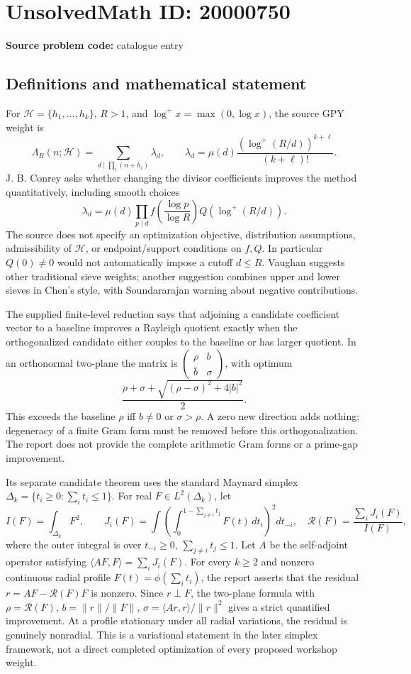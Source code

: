 \documentclass[11pt]{article}
\begin{document}
\section*{UnsolvedMath ID: 20000750}
\textbf{Source problem code:} catalogue entry
\subsection{Definitions and mathematical statement}
For \(\mathcal H=\{h_1,\ldots,h_k\}\), \(R>1\), and \(\log^+x=\max(0,\log x)\), the source GPY weight is
\[
 \Lambda_R(n;\mathcal H)=\sum_{d\mid\prod_i(n+h_i)}\lambda_d,
 \qquad\lambda_d=\mu(d)\frac{(\log^+(R/d))^{k+\ell}}{(k+\ell)!}.
\]
J. B. Conrey asks whether changing the divisor coefficients improves the method quantitatively, including smooth choices
\[
 \lambda_d=\mu(d)\prod_{p\mid d}f\left(\frac{\log p}{\log R}\right)
 Q(\log^+(R/d)).
\]
The source does not specify an optimization objective, distribution assumptions, admissibility of \(\mathcal H\), or endpoint/support conditions on \(f,Q\). In particular \(Q(0)\ne0\) would not automatically impose a cutoff \(d\le R\). Vaughan suggests other traditional sieve weights; another suggestion combines upper and lower sieves in Chen's style, with Soundararajan warning about negative contributions.

The supplied finite-level reduction says that adjoining a candidate coefficient vector to a baseline improves a Rayleigh quotient exactly when the orthogonalized candidate either couples to the baseline or has larger quotient. In an orthonormal two-plane the matrix is \(\begin{pmatrix}\rho&b\\\bar b&\sigma\end{pmatrix}\), with optimum
\[
 \frac{\rho+\sigma+\sqrt{(\rho-\sigma)^2+4|b|^2}}2.
\]
This exceeds the baseline \(\rho\) iff \(b\ne0\) or \(\sigma>\rho\). A zero new direction adds nothing; degeneracy of a finite Gram form must be removed before this orthogonalization. The report does not provide the complete arithmetic Gram forms or a prime-gap improvement.

Its separate candidate theorem uses the standard Maynard simplex \(\Delta_k=\{t_i\ge0:\sum_i t_i\le1\}\). For real \(F\in L^2(\Delta_k)\), let
\[
 I(F)=\int_{\Delta_k}F^2,\qquad
 J_i(F)=\int\left(\int_0^{1-\sum_{j\ne i}t_j}F(t)\,dt_i\right)^2dt_{-i},
 \quad\mathcal R(F)=\frac{\sum_iJ_i(F)}{I(F)},
\]
where the outer integral is over \(t_{-i}\ge0\), \(\sum_{j\ne i}t_j\le1\). Let \(A\) be the self-adjoint operator satisfying \(\langle AF,F\rangle=\sum_iJ_i(F)\). For every \(k\ge2\) and nonzero continuous radial profile \(F(t)=\phi(\sum_i t_i)\), the report asserts that the residual \(r=AF-\mathcal R(F)F\) is nonzero. Since \(r\perp F\), the two-plane formula with
\(\rho=\mathcal R(F)\), \(b=\|r\|/\|F\|\), \(\sigma=\langle Ar,r\rangle/\|r\|^2\)
gives a strict quantified improvement. At a profile stationary under all radial variations, the residual is genuinely nonradial. This is a variational statement in the later simplex framework, not a direct completed optimization of every proposed workshop weight.
\end{document}
